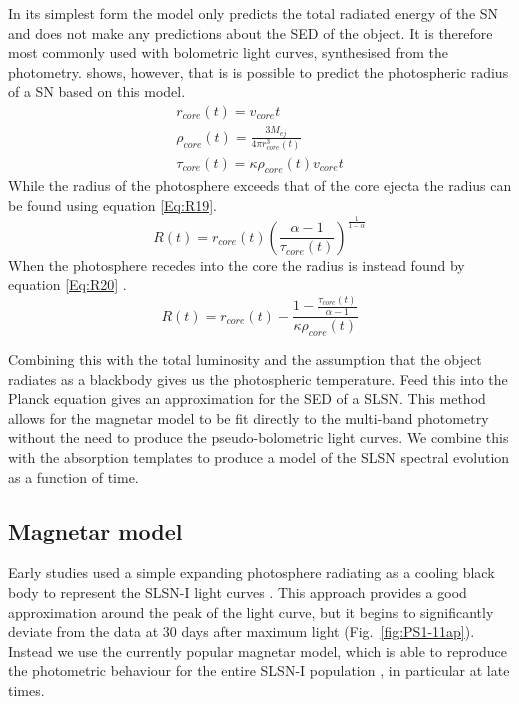 In its simplest form the model only predicts the total radiated energy of the SN and does not make any predictions about the SED of the object. It is therefore most commonly used with bolometric light curves, synthesised from the photometry. \cite{2013ApJ...770..128I} shows, however, that is is possible to predict the photospheric radius of a SN based on this model.
\begin{align}
r_{core}(t) = v_{core}  t \\
\rho_{core}(t)= \frac{3 M_{ej}}{4  \pi  r_{core}^3(t)}\\
\tau_{core}(t) = \kappa  \rho_{core}(t) v_{core} t
\end{align}
While the radius of the photosphere exceeds that of the core ejecta the radius can be found using equation \ref{Eq:R19}.
\begin{equation}
\label{Eq:R19}
R(t) = r_{core}(t) \left(\frac{\alpha - 1}{\tau_{core}(t)}\right)^\frac{1}{1 - \alpha}
\end{equation}
When the photosphere recedes into the core the radius is instead found by equation \ref{Eq:R20} \citep{2013ApJ...770..128I}.
\begin{equation}
\label{Eq:R20}
R(t) = r_{core}(t) - \frac{1 - \frac{\tau_{core}(t)}{\alpha - 1}}{\kappa \rho_{core}(t)}
\end{equation}

Combining this with the total luminosity and the assumption that the object radiates as a blackbody gives us the photospheric temperature. Feed this into the Planck equation gives an approximation for the SED of a SLSN. This method allows for the magnetar model to be fit directly to the multi-band photometry without the need to produce the pseudo-bolometric light curves. We combine this with the absorption templates to produce a model of the SLSN spectral evolution as a function of time.

\subsection{Magnetar model}
Early studies used a simple expanding photosphere radiating as a
cooling black body to represent the SLSN-I light curves \citep[eg.
][]{2013ApJ...779...98H}. This approach provides a good approximation
around the peak of the light curve, but it begins to significantly
deviate from the data at 30 days after maximum light
(Fig.~\ref{fig:PS1-11ap}).  Instead we use the currently popular
magnetar model, which is able to reproduce the photometric behaviour
for the entire SLSN-I population
\citep{2013ApJ...770..128I,2013Natur.502..346N}, in particular at late
times.

